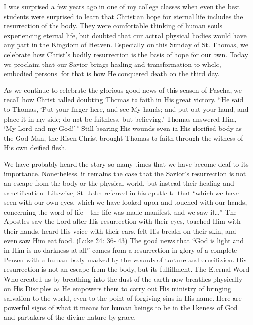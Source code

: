 \documentclass[twoside, letterpaper, 12pt]{report}
\begin{document}
\begin{maybetwocolumns}

I was surprised a few years ago in one of my college classes when even the best students
were surprised to learn that Christian hope for eternal life includes the resurrection of the body.
They were comfortable thinking of human souls experiencing eternal life, but doubted that our
actual physical bodies would have any part in the Kingdom of Heaven. Especially on this Sunday
of St. Thomas, we celebrate how Christ’s bodily resurrection is the basis of hope for our own.
Today we proclaim that our Savior brings healing and transformation to whole, embodied persons,
for that is how He conquered death on the third day.

As we continue to celebrate the glorious good news of this season of Pascha, we recall how Christ
called doubting Thomas to faith in His great victory. “He said to Thomas, ‘Put your finger here,
and see My hands; and put out your hand, and place it in my side; do not be faithless, but believing.’
Thomas answered Him, ‘My Lord and my God!’” Still bearing His wounds even in His glorified
body as the God-Man, the Risen Christ brought Thomas to faith through the witness of His own
deified flesh.

We have probably heard the story so many times that we have become deaf to its importance.
Nonetheless, it remains the case that the Savior’s resurrection is not an escape from the body or
the physical world, but instead their healing and sanctification. Likewise, St. John referred in his
epistle to that “which we have seen with our own eyes, which we have looked upon and touched
with our hands, concerning the word of life—the life was made manifest, and we saw it…” The
Apostles saw the Lord after His resurrection with their eyes, touched Him with their hands, heard
His voice with their ears, felt His breath on their skin, and even saw Him eat food. (Luke 24: 36-
43) The good news that “God is light and in Him is no darkness at all” comes from a resurrection
in glory of a complete Person with a human body marked by the wounds of torture and crucifixion.
His resurrection is not an escape from the body, but its fulfillment. The Eternal Word Who created
us by breathing into the dust of the earth now breathes physically on His Disciples as He empowers
them to carry out His ministry of bringing salvation to the world, even to the point of forgiving
sins in His name. Here are powerful signs of what it means for human beings to be in the likeness
of God and partakers of the divine nature by grace.


\end{maybetwocolumns}
\end{document}
